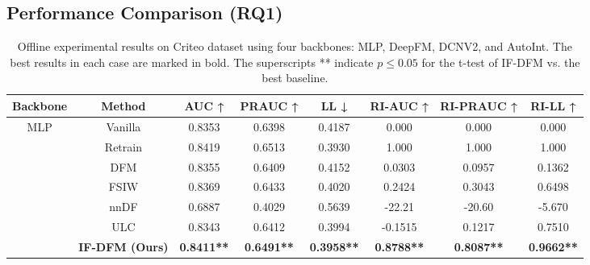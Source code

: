 \subsection{Performance Comparison (RQ1)}
\begin{table*}[htbp]
\centering
\setlength{\tabcolsep}{10pt} 
\caption{Offline experimental results on Criteo dataset using four backbones: MLP, DeepFM, DCNV2, and AutoInt.  The best results in each case are marked in bold. The superscripts ** indicate $p \leq 0.05$ for the t-test of IF-DFM vs. the best baseline.}
\label{main}
\small
\begin{tabular}{c|c|cccccc}
\toprule
{Backbone}                 & {Method}  & \multicolumn{1}{c}{{AUC ↑}} & \multicolumn{1}{c}{{PRAUC ↑}} & \multicolumn{1}{c}{{LL ↓}} &\multicolumn{1}{c}{{RI-AUC ↑}} & \multicolumn{1}{c}{{RI-PRAUC ↑}} & {RI-LL ↑}         \\ \midrule
\multirow{7}{*}{{MLP}}     & {Vanilla} & 0.8353                     & 0.6398                       & 0.4187                    & 0.000                         & 0.000                           & 0.000           \\
                         & {Retrain} & 0.8419                     & 0.6513                       & 0.3930                    & 1.000                         & 1.000                           & 1.000           \\ \cline{2-8} 
                         &  {DFM}     & 0.8355                     & 0.6409                       & 0.4152                    & 0.0303                        & 0.0957                          & 0.1362          \\
                         & {FSIW}    & 0.8369                     & 0.6433                       & 0.4020                    & 0.2424                        & 0.3043                          & 0.6498          \\
                         & {nnDF}    & 0.6887                     & 0.4029                       & 0.5639                    & -22.21                        & -20.60                          & -5.670          \\
                         & {ULC}     & 0.8343                     & 0.6412                       & 0.3994                    & -0.1515                       & 0.1217                          & 0.7510          \\
                         & \textbf{IF-DFM (Ours)}   &  \textbf{0.8411**}               & \textbf{0.6491**}               & \textbf{0.3958**}           & \textbf{0.8788**}               & \textbf{0.8087**}                 & \textbf{0.9662**} \\ \midrule

\end{tabular}
\end{table*}
